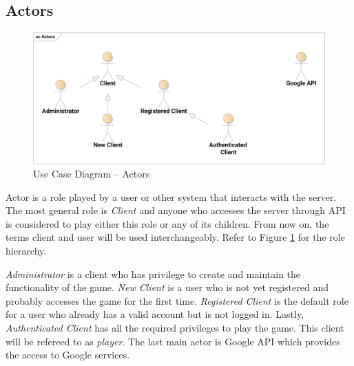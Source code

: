 	\subsection{Actors}
		\begin{figure}[h]	
			\includegraphics[width=\textwidth]{figures/UC_Actors}
			\centering			
			\caption{Use Case
				 Diagram -- Actors}
			\label{fig:ucactors}
		\end{figure}
		\noindent Actor is a role played by a user or other system that interacts with the server. The most general role is \textit{Client} and anyone who accesses the server through API is considered to play either this role or any of its children. From now on, the terms client and user will be used interchangeably. Refer to Figure \ref{fig:ucactors} for the role hierarchy.
		
		\textit{Administrator} is a client who has privilege to create and maintain the functionality of the game. \textit{New Client} is a user who is not yet registered and probably accesses the game for the first time. \textit{Registered Client} is the default role for a user who already has a valid account but is not logged in. Lastly, \textit{Authenticated Client} has all the required privileges to play the game. This client will be refereed to as \textit{player}. The last main actor is Google API which provides the access to Google services. 		

